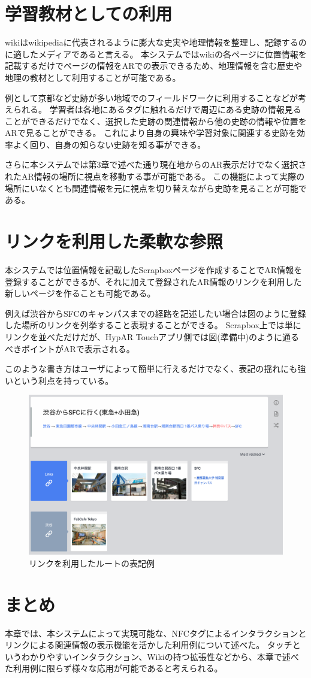 \section{学習教材としての利用}
wikiはwikipediaに代表されるように膨大な史実や地理情報を整理し、記録するのに適したメディアであると言える。
本システムではwikiの各ページに位置情報を記載するだけでページの情報をARでの表示できるため、地理情報を含む歴史や地理の教材として利用することが可能である。

例として京都など史跡が多い地域でのフィールドワークに利用することなどが考えられる。
学習者は各地にあるタグに触れるだけで周辺にある史跡の情報見ることができるだけでなく、選択した史跡の関連情報から他の史跡の情報や位置をARで見ることができる。
これにより自身の興味や学習対象に関連する史跡を効率よく回り、自身の知らない史跡を知る事ができる。

さらに本システムでは第3章で述べた通り現在地からのAR表示だけでなく選択されたAR情報の場所に視点を移動する事が可能である。
この機能によって実際の場所にいなくとも関連情報を元に視点を切り替えながら史跡を見ることが可能である。



\section{リンクを利用した柔軟な参照}
\label{link_enum_notation}
本システムでは位置情報を記載したScrapboxページを作成することでAR情報を登録することができるが、それに加えて登録されたAR情報のリンクを利用した新しいページを作ることも可能である。

例えば渋谷からSFCのキャンパスまでの経路を記述したい場合は図のように登録した場所のリンクを列挙すること表現することができる。
Scrapbox上では単にリンクを並べただけだが、HypAR Touchアプリ側では図(準備中)のように通るべきポイントがARで表示される。


このような書き方はユーザによって簡単に行えるだけでなく、表記の揺れにも強いという利点を持っている。

\begin{figure}[h]
  \centering
  \includegraphics[width=150mm]{images/route_scrapbox.png}
  \caption{リンクを利用したルートの表記例} \label{fig:route_scrapbox}
\end{figure}


\section{まとめ}
本章では、本システムによって実現可能な、NFCタグによるインタラクションとリンクによる関連情報の表示機能を活かした利用例について述べた。
タッチというわかりやすいインタラクション、Wikiの持つ拡張性などから、本章で述べた利用例に限らず様々な応用が可能であると考えられる。